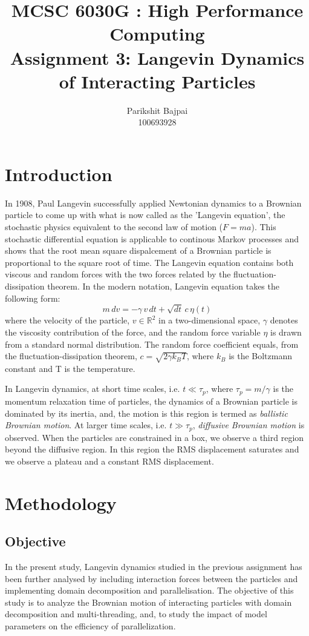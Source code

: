 \documentclass[11pt, oneside]{article}
\title{MCSC 6030G : High Performance Computing \\ Assignment 3: Langevin Dynamics of Interacting Particles}
\author{Parikshit Bajpai \\ 100693928}
\date{}							%
\begin{document}
\maketitle

\section{Introduction}
In 1908, Paul Langevin successfully applied Newtonian dynamics to a Brownian particle to come up with what is now called as the 'Langevin equation', the stochastic physics equivalent to the second law of motion (\(F=ma\)). This stochastic differential equation is applicable to continous Markov processes and shows that the root mean square dispalcement of a Brownian particle is proportional to the square root of time. The Langevin equation contains both viscous and random forces with the two forces related by the fluctuation-dissipation theorem. In the modern notation, Langevin equation takes the following form:     
  \begin{equation} \label{Langevin}
    m\,dv = - \gamma\,v\,dt + \sqrt{dt}\,c\,\eta(t) 
  \end{equation}
  where the velocity of the particle, \(v \in \mathbb{R}^2\) in a two-dimensional space, \(\gamma\)  denotes the viscosity contribution of the force, and the random force variable \(\eta\) is drawn from a standard normal distribution. The random force  coefficient equals, from the fluctuation-dissipation theorem, \(c = \sqrt{2 \gamma k_B T}\), where \(k_B\) is the Boltzmann constant and T is the temperature.

  In Langevin dynamics, at short time scales, i.e. \(t \ll \tau_p \), where \(\tau_p =  m / \gamma \) is the momentum relaxation time of particles, the dynamics of a Brownian particle is dominated by its inertia, and, the motion is this region is termed as \textit{ballistic Brownian motion}. At larger time scales, i.e.  \(t \gg  \tau_p\), \textit{diffusive Brownian motion} is observed. When the particles are constrained in a box, we observe a third region beyond the diffusive region. In this region the RMS displacement saturates and we observe a plateau and a constant RMS displacement.
  
\section{Methodology}
   \subsection{Objective}
In the present study, Langevin dynamics studied in the previous assignment has been further analysed by including interaction forces between the particles and implementing domain decomposition and parallelisation. The objective of this study is to analyze the Brownian motion of interacting particles with domain decomposition and multi-threading, and, to study the impact of model parameters on the efficiency of parallelization.
\end{document}
